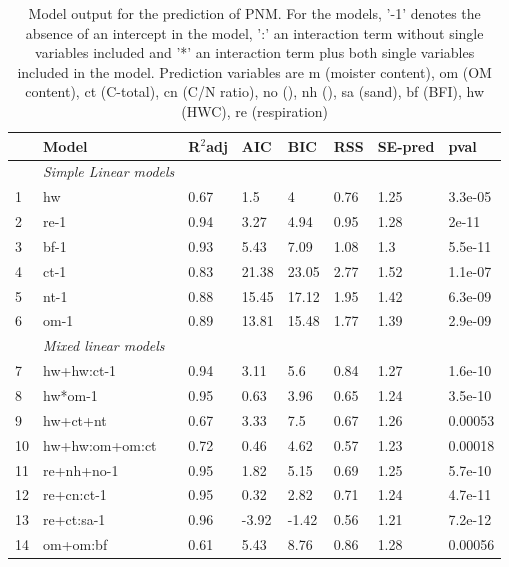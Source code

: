 \documentclass[10pt,twoside,dutch,english]{report}
\begin{document}
\begin{table}[hb] %
		\caption{Model output for the prediction of PNM. For the models,  '-1' denotes the absence of an intercept in the model,  ':' an interaction term without single variables included and '*' an interaction term plus both single variables included in the model. Prediction variables are m (moister content), om (OM content), ct (C-total), cn (C/N ratio), no (), nh (), sa (sand), bf (BFI), hw (HWC), re (respiration)}
		\footnotesize 
		\renewcommand{\arraystretch}{1.2}
		
		\begin{tabu} to \textwidth{X[1,l]X[3,l]X[1,r]X[1,r]X[1,r]X[1,r]X[1,r]X[1,r]}
			\toprule \rowfont{\bfseries}
 & Model & R$^2$adj & AIC & BIC & RSS & SE-pred & pval \\ 
 \midrule
&\textit{Simple Linear models}& & & & & & \\
1 & hw & 0.67 & 1.5 & 4 & 0.76 & 1.25 & 3.3e-05 \\ 
2 & re-1 & 0.94 & 3.27 & 4.94 & 0.95 & 1.28 & 2e-11 \\ 
3 & bf-1 & 0.93 & 5.43 & 7.09 & 1.08 & 1.3 & 5.5e-11 \\ 
4 & ct-1 & 0.83 & 21.38 & 23.05 & 2.77 & 1.52 & 1.1e-07 \\ 
5 & nt-1 & 0.88 & 15.45 & 17.12 & 1.95 & 1.42 & 6.3e-09 \\ 
6 & om-1 & 0.89 & 13.81 & 15.48 & 1.77 & 1.39 & 2.9e-09 \\   \addlinespace[0.5cm]
&\textit{Mixed linear models}& & & & & & \\
 7 & hw+hw:ct-1 & 0.94 & 3.11 & 5.6 & 0.84 & 1.27 & 1.6e-10 \\ 
 8 & hw*om-1 & 0.95 & 0.63 & 3.96 & 0.65 & 1.24 & 3.5e-10 \\ 
 9 & hw+ct+nt & 0.67 & 3.33 & 7.5 & 0.67 & 1.26 & 0.00053 \\ 
 10 & hw+hw:om+om:ct & 0.72 & 0.46 & 4.62 & 0.57 & 1.23 & 0.00018 \\ 
 11 & re+nh+no-1 & 0.95 & 1.82 & 5.15 & 0.69 & 1.25 & 5.7e-10 \\ 
 12 & re+cn:ct-1 & 0.95 & 0.32 & 2.82 & 0.71 & 1.24 & 4.7e-11 \\ 
 13 & re+ct:sa-1 & 0.96 & -3.92 & -1.42 & 0.56 & 1.21 & 7.2e-12 \\ 
 14 & om+om:bf & 0.61 & 5.43 & 8.76 & 0.86 & 1.28 & 0.00056 \\
\bottomrule
			
		\end{tabu}
		\label{tab: resuls_mods}
	\end{table}
\end{document}
